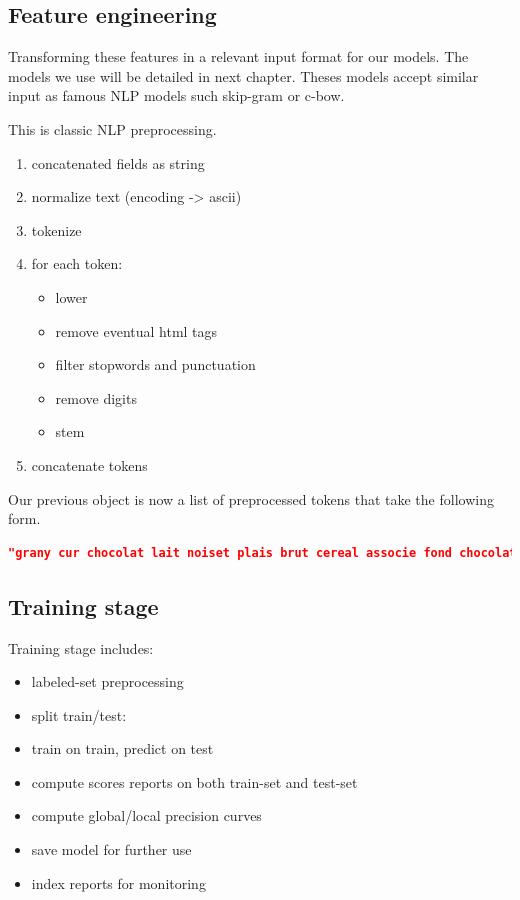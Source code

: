 \subsection{Feature engineering}

Transforming these features in a relevant input format for our models. 
The models we use will be detailed in next chapter. Theses models accept similar input as famous NLP models such skip-gram or c-bow.

This is classic NLP preprocessing.

\begin{enumerate}
	\item concatenated fields as string
	\item normalize text (encoding -> ascii)
	\item tokenize
	\item for each token:
	\begin{itemize}
		\item lower
		\item remove eventual html tags
		\item filter stopwords and punctuation
		\item remove digits
		\item stem
	\end{itemize}
	\item concatenate tokens
\end{enumerate}

Our previous object is now a list of preprocessed tokens that take the following form.

\begin{lstlisting}[language=json]
"grany cur chocolat lait noiset plais brut cereal associe fond chocolat lait grany barr cerealier fourre chocolat noiset grany coeur fond gout chocolat noiset ingredient cereal farin riz farin ble grain flocon ble flocon avoin flocon orge farin ble malt sirop glucos fructos sucr huil coprah lait ecrem poudr huil palm chocolat sucr pat cacao pat noiset cacao maigr poudr humect glycerol sel gluten ble dextros emulsifi lecithin tournesol malt orge arom noiset arachid conten soj autr fruit coqu"
\end{lstlisting}

\subsection{Training stage}

Training stage includes:
\begin{itemize}
	\item labeled-set preprocessing
	\item split train/test:
	\item train on train, predict on test
	\item compute scores reports on both train-set and test-set
	\item compute global/local precision curves
	\item save model for further use
	\item index reports for monitoring
\end{itemize}


